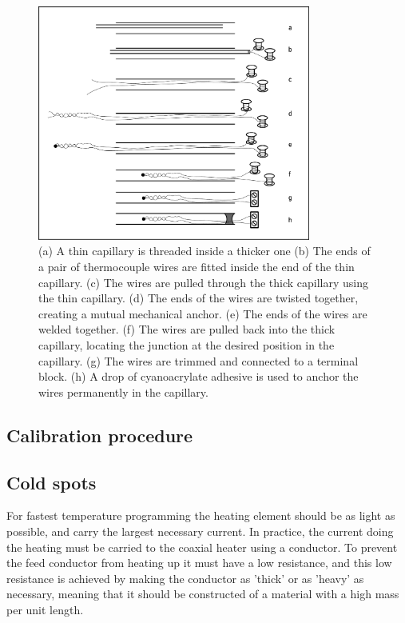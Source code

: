 \begin{figure}
	\centering
	\includegraphics[width=0.8\textwidth]{./Figures/FineWireThermocouple.pdf}
	\decoRule
	
\caption[A cartoon explaining how to construct a long, thin thermocouple
probe.]{(a) A thin capillary is threaded inside a thicker one (b) The ends of a
pair of thermocouple wires are fitted inside the end of the thin capillary. (c)
The wires are pulled through the thick capillary using the thin capillary. (d)
The ends of the wires are twisted together, creating a mutual mechanical anchor.
(e) The ends of the wires are welded together. (f) The wires are pulled back
into the thick capillary, locating the junction at the desired position in the
capillary. (g) The wires are trimmed and connected to a terminal block. (h) A
drop of cyanoacrylate adhesive is used to anchor the wires permanently in the
capillary. }
	
	\label{fig:FineWireThermocouple}
\end{figure}

\subsection{Calibration procedure}



\subsection{Cold spots}

For fastest temperature programming the heating element should be as light as
possible, and carry the largest necessary current. In practice, the current
doing the heating must be carried to the coaxial heater using a conductor. To
prevent the feed conductor from heating up it must have a low resistance, and
this low resistance is achieved by making the conductor as 'thick' or as 'heavy'
as necessary, meaning that it should be constructed of a material with a high
mass per unit length.

